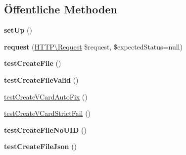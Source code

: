 \subsection*{Öffentliche Methoden}
\begin{DoxyCompactItemize}
\item 
\mbox{\label{class_sabre_1_1_card_d_a_v_1_1_validate_v_card_test_a427d5d76e1b3721e3a1153c8468bc13e}} 
{\bfseries set\+Up} ()
\item 
\mbox{\label{class_sabre_1_1_card_d_a_v_1_1_validate_v_card_test_a6173c8a25d0b5cdf3b461914a5e30f35}} 
{\bfseries request} (\mbox{\hyperlink{class_sabre_1_1_h_t_t_p_1_1_request}{H\+T\+T\+P\textbackslash{}\+Request}} \$request, \$expected\+Status=null)
\item 
\mbox{\label{class_sabre_1_1_card_d_a_v_1_1_validate_v_card_test_a595edfcb8c2aa3f42acbe9e604ca5044}} 
{\bfseries test\+Create\+File} ()
\item 
\mbox{\label{class_sabre_1_1_card_d_a_v_1_1_validate_v_card_test_a22e944612f1ae4b14fb61efa74435a7a}} 
{\bfseries test\+Create\+File\+Valid} ()
\item 
\mbox{\hyperlink{class_sabre_1_1_card_d_a_v_1_1_validate_v_card_test_a8b8af0bd4c4f077e3179de579af6c0a3}{test\+Create\+V\+Card\+Auto\+Fix}} ()
\item 
\mbox{\hyperlink{class_sabre_1_1_card_d_a_v_1_1_validate_v_card_test_a95230e1ac9e3dfaab100187f586c56a5}{test\+Create\+V\+Card\+Strict\+Fail}} ()
\item 
\mbox{\label{class_sabre_1_1_card_d_a_v_1_1_validate_v_card_test_a7f3c9c1bfdc6882ea367624aa1659071}} 
{\bfseries test\+Create\+File\+No\+U\+ID} ()
\item 
\mbox{\label{class_sabre_1_1_card_d_a_v_1_1_validate_v_card_test_ac660db561ad212fb8d42f520fbc399fd}} 
{\bfseries test\+Create\+File\+Json} ()
\item 
\mbox{\label{class_sabre_1_1_card_d_a_v_1_1_validate_v_card_test_a603c275959f2daddb87623d2d534cbfe}} 

\end{DoxyCompactItemize}
